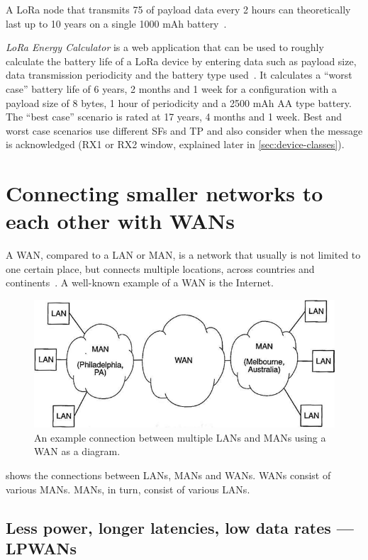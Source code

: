 A \ac{LoRa} node that transmits \SI{75}{\byte} of payload data every 2 hours can theoretically last up to 10 years on a single 1000 mAh battery~\cite{cheong_comparison_2017}.

\emph{LoRa Energy Calculator} is a web application that can be used to roughly calculate the battery life of a \ac{LoRa} device by entering data such as payload size, data transmission periodicity and the battery type used~\cite{dramco_research_group_lora_2023}.
It calculates a ``worst case'' battery life of 6 years, 2 months and 1 week for a configuration with a payload size of 8 bytes, 1 hour of periodicity and a 2500 mAh AA type battery.
The ``best case'' scenario is rated at 17 years, 4 months and 1 week.
Best and worst case scenarios use different \aclp{SF} and \ac{TP} and also consider when the message is acknowledged (RX1 or RX2 window, explained later in \cref{sec:device-classes}).

\section{Connecting smaller networks to each other with \aclp{WAN}}

A \ac{WAN}, compared to a \acf{LAN} or \acf{MAN}, is a network that usually is not limited to one certain place, but connects multiple locations, across countries and continents~\cite[p. 2]{sadiku_fundamentals_2022}.
A well-known example of a \ac{WAN} is the Internet.

\begin{figure}[htbp]
    \centering
    \includegraphics[width=.6\textwidth]{pictures/lorawan-structure/wan_diagram.png}
    \caption{
        An example connection between multiple \acp{LAN} and \acp{MAN} using a \acf{WAN} as a diagram.\protect\cite{sadiku_fundamentals_2022}
    }\label{pic:wan-diagram}
\end{figure}

 shows the connections between \acp{LAN}, \acp{MAN} and \acp{WAN}.
\acp{WAN} consist of various \acp{MAN}.
\acp{MAN}, in turn, consist of various \acp{LAN}.

\subsection{Less power, longer latencies, low data rates — \aclp{LPWAN}}

